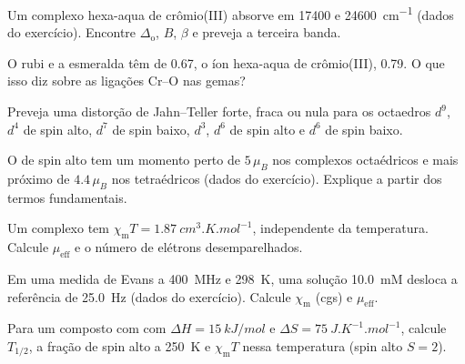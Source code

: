 \begin{exercise}[$\star\star$]\label{exo:b3:complex-spectra-magnetism:6}
Um complexo hexa-aqua de crômio(III) absorve em 17400 e \qty{24600}{cm^{-1}} (dados do
exercício). Encontre $\Delta_{\mathrm o}$, $B$, $\beta$ e preveja a terceira banda.
\end{exercise}

\begin{exercise}[$\star\star$]\label{exo:b3:complex-spectra-magnetism:7}
O rubi e a esmeralda têm  de 0.67, o íon hexa-aqua de crômio(III),
0.79. O que isso diz sobre as ligações Cr--O nas gemas?
\end{exercise}

\begin{exercise}[$\star\star$]\label{exo:b3:complex-spectra-magnetism:8}
Preveja uma distorção de Jahn--Teller forte, fraca ou nula para os octaedros $d^9$, $d^4$ de
spin alto, $d^7$ de spin baixo, $d^3$, $d^6$ de spin alto e $d^6$ de spin baixo.
\end{exercise}

\begin{exercise}[$\star\star$]\label{exo:b3:complex-spectra-magnetism:9}
O  de spin alto tem um momento perto de $5\,\mu_B$ nos complexos octaédricos e mais
próximo de $4.4\,\mu_B$ nos tetraédricos (dados do exercício). Explique a partir dos termos
fundamentais.
\end{exercise}

\begin{exercise}[$\star\star\star$]\label{exo:b3:complex-spectra-magnetism:10}
Um complexo tem $\chi_{\mathrm m}T = \qty{1.87}{cm^3.K.mol^{-1}}$, independente da temperatura. Calcule $\mu_{\mathrm{eff}}$ e
o número de elétrons desemparelhados.
\end{exercise}

\begin{exercise}[$\star\star\star$]\label{exo:b3:complex-spectra-magnetism:11}
Em uma medida de Evans a \qty{400}{MHz} e \qty{298}{K}, uma solução \qty{10.0}{mM} desloca a
referência de \qty{25.0}{Hz} (dados do exercício). Calcule $\chi_{\mathrm m}$ (cgs) e $\mu_{\mathrm{eff}}$.
\end{exercise}

\begin{exercise}[$\star\star\star$]\label{exo:b3:complex-spectra-magnetism:12}
Para um composto com  com $\Delta H = \qty{15}{kJ/mol}$ e $\Delta S = \qty{75}{J.K^{-1}.mol^{-1}}$, calcule $T_{1/2}$,
a fração de spin alto a \qty{250}{K} e $\chi_{\mathrm m}T$ nessa temperatura (spin alto $S = 2$).
\end{exercise}

